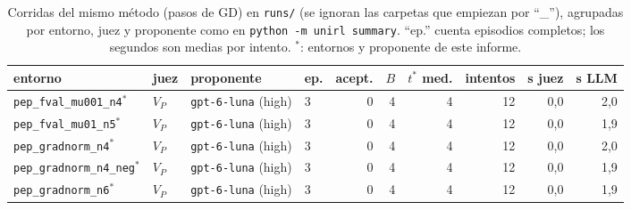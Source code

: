 \documentclass[11pt,a4paper]{article}
\begin{document}
\begin{table}[!ht]
\centering
\scriptsize
\begin{tabular}{@{}llllrrrrrr@{}}
\toprule
entorno & juez & proponente & ep. & acept. & $B$ & $t^*$ med. & intentos & s juez & s LLM \\
\midrule
\texttt{pep\_\allowbreak{}fval\_\allowbreak{}mu001\_\allowbreak{}n4}$^\ast$ & $V_P$ & \texttt{gpt-\allowbreak{}6-\allowbreak{}luna} (high) & 3 & 0 & 4 & 4 & 12 & 0{,}0 & 2{,}0 \\
\texttt{pep\_\allowbreak{}fval\_\allowbreak{}mu01\_\allowbreak{}n5}$^\ast$ & $V_P$ & \texttt{gpt-\allowbreak{}6-\allowbreak{}luna} (high) & 3 & 0 & 4 & 4 & 12 & 0{,}0 & 1{,}9 \\
\texttt{pep\_\allowbreak{}gradnorm\_\allowbreak{}n4}$^\ast$ & $V_P$ & \texttt{gpt-\allowbreak{}6-\allowbreak{}luna} (high) & 3 & 0 & 4 & 4 & 12 & 0{,}0 & 2{,}0 \\
\texttt{pep\_\allowbreak{}gradnorm\_\allowbreak{}n4\_\allowbreak{}neg}$^\ast$ & $V_P$ & \texttt{gpt-\allowbreak{}6-\allowbreak{}luna} (high) & 3 & 0 & 4 & 4 & 12 & 0{,}0 & 1{,}9 \\
\texttt{pep\_\allowbreak{}gradnorm\_\allowbreak{}n6}$^\ast$ & $V_P$ & \texttt{gpt-\allowbreak{}6-\allowbreak{}luna} (high) & 3 & 0 & 4 & 4 & 12 & 0{,}0 & 1{,}9 \\
\bottomrule
\end{tabular}
\caption{Corridas del mismo método (pasos de GD) en \texttt{runs/} (se ignoran las carpetas que empiezan por ``\_''), agrupadas por entorno, juez y proponente como en \texttt{python -m unirl summary}. ``ep.'' cuenta episodios completos; los segundos son medias por intento. $^\ast$: entornos y proponente de este informe.}
\label{tab:comparacion}
\end{table}
\end{document}
